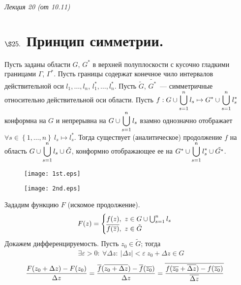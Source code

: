\begin{flushright}
    \textit{Лекция 20 (от 10.11)}
\end{flushright}
\section{$\S 25.$ Принцип симметрии.}
\theorem
Пусть заданы области $G$, $G^*$ в верхней полуплоскости с кусочно гладкими
границами $\Gamma$, $\Gamma^*$. Пусть границы содержат конечное чило интервалов
действительной оси $l_1, \dots, l_n$, $l_1^*, \dots, l_n^*$. Пусть $\tilde{G}$,
$\tilde{G^*}$~--- симметричные относительно действительной оси области. Пусть
$f: G \cup \displaystyle \bigcup_{s=1}^n l_s \mapsto G^*\cup \displaystyle \bigcup_{s=1}^n l_s^*$
конформна на $G$ и непрерывна на $G \cup \displaystyle \bigcup_{s=1}^n l_s$ взамно
однозначно отображает $\forall s \in \left\{ 1, \dots, n \right\} \ l_s \mapsto
l_s^*$. Тогда существует (аналитическое) продолжение $f$ на область $G \cup \displaystyle
\bigcup_{s=1}^n l_s \cup \tilde{G}$, конформно отображающее ее на $G^* \cup \displaystyle
\bigcup_{s=1}^n l_s^* \cup \tilde{G^*}$.
\begin{figure}[h!]
    \begin{minipage}[c]{0.5\textwidth}
        \centering
        \texttt{[image: 1st.eps]}
    \end{minipage}
    \begin{minipage}[c]{0.5\textwidth}
        \centering
        \texttt{[image: 2nd.eps]}
    \end{minipage}
    \label{fig:25.1}
\end{figure}
\pr
Зададим функцию $F$ (искомое продолжение).
\begin{equation}\label{(25.1)}
    F(z) = \begin{cases}
        f(z), \ z \in G \cup \bigcup_{s=1}^n l_s \\
        \overline{f(\overline{z})}, \ z \in \tilde{G}
    \end{cases}
\end{equation}
Докажем дифференцируемость. Пусть $z_0 \in \tilde{G}$; тогда
\begin{align*}
  & \exists \varepsilon > 0: \ \forall \Delta z: \ \left| \Delta z \right| < \varepsilon \ z_0+\Delta z \in G
\end{align*}
\begin{align*}
  & \frac{F(z_0+\Delta z) - F(z_0)}{\Delta z} = \frac{\overline{f}(\overline{z_0+\Delta z}) - \overline{f}(\overline{z_0})}{\Delta z} = \overline{\frac{f(\overline{z_0}+\overline{\Delta z}) - f(\overline{z_0})}{\overline{\Delta z}}}
\end{align*}
